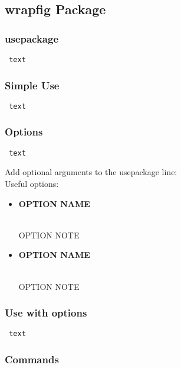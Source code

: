 \documentclass[class=article , crop=false, titlepage, twoside, multi={itemize, figure, verbatim}, float=false]{standalone}
\title{}  %
\begin{document}

\ifstandalone
\maketitle %
\clearpage
\tableofcontents %
\clearpage
\fi

\clearpage


\subsection[wrapfig Package]{\LARGE wrapfig Package}

\subsubsection[usepackage]{\Large usepackage}
\begin{verbatim} text \end{verbatim}

\subsubsection[Simple Use]{\Large Simple Use}
\begin{verbatim} text \end{verbatim}

\subsubsection[Options]{\Large Options}
\begin{verbatim} text \end{verbatim}
Add optional arguments to the usepackage line:\\
Useful options:\begin{itemize}
\item \begin{large}\textbf{OPTION NAME}\end{large}\\OPTION NOTE
\item \begin{large}\textbf{OPTION NAME}\end{large}\\OPTION NOTE
\end{itemize}

\subsubsection[Use with Options]{\Large Use with options}
\begin{verbatim} text \end{verbatim}

\subsubsection[Commands]{\Large Commands}
\end{document}
